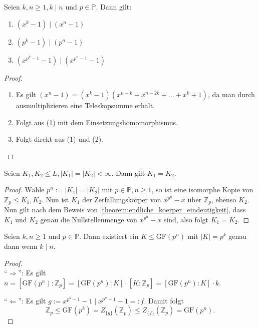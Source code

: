 \begin{lemma}
    Seien $k, n \geq 1, k \mid n$ und $p \in \mathbb{P}$. Dann gilt:
    \begin{enumerate}
        \item $(x^k - 1) \mid (x^n - 1)$
        \item $(p^k - 1) \mid (p^n - 1)$
        \item $(x^{p^k - 1} - 1) \mid (x^{p^n - 1} - 1)$
    \end{enumerate}
\end{lemma}

\begin{proof}{\ }
    \begin{enumerate}
        \item Es gilt $(x^n - 1) = (x^k - 1)(x^{n-k} + x^{n - 2k} + \hdots + x^k + 1)$, da man durch ausmultiplizieren eine Teleskopsumme erhält. 
        \item Folgt aus (1) mit dem Einsetzungshomomorphismus.
        \item Folgt direkt aus (1) und (2).
    \end{enumerate}
\end{proof}

\begin{lemma}
    Seien $K_1, K_2 \leq L, \vert K_1 \vert = \vert K_2 \vert<\infty$. Dann gilt $K_1 = K_2$.
\end{lemma}

\begin{proof}
    Wähle $p^n := \vert K_1 \vert = \vert K_2 \vert$ mit $p \in \mathbb{P}, n \geq 1$, so ist eine isomorphe Kopie von $\mathbb{Z}_p \leq K_1, K_2$. Nun ist $K_1$ der Zerfällungskörper von $x^{p^n} - x$ über $\mathbb{Z}_p$, ebenso $K_2$. Nun gilt nach dem Beweis von \cref{theorem:endliche_koerper_eindeutigkeit}, dass $K_1$ und $K_2$ genau die Nullstellenmenge von $x^{p^n}-x$ sind, also folgt $K_1 = K_2$.
\end{proof}

\begin{proposition}
    Seien $k, n \geq 1$ und $p \in \mathbb{P}$. Dann existiert ein $K \leq \mathrm{GF}(p^n)$ mit $\vert K \vert = p^k$ genau dann wenn $k \mid n$.
\end{proposition}

\begin{proof}{\ } \\
    ``$\Rightarrow$'': Es gilt $n = [\mathrm{GF}(p^n) : \mathbb{Z}_p] = [\mathrm{GF}(p^n) : K] \cdot [K : \mathbb{Z}_p] = [\mathrm{GF}(p^n) : K] \cdot k$.

    ``$\Leftarrow$'': Es gilt $g := x^{p^k - 1} - 1 \mid x^{p^n - 1} - 1 =: f$.
    Damit folgt
    $$ \mathbb{Z}_p \leq \mathrm{GF}(p^k) = Z_{\{g\}}(\mathbb{Z}_p) \leq Z_{\{f\}}(\mathbb{Z}_p) = \mathrm{GF}(p^n). $$
\end{proof}

